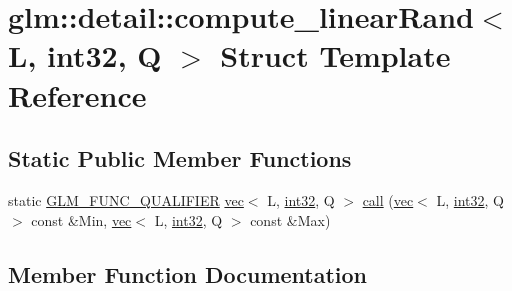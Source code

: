 \hypertarget{structglm_1_1detail_1_1compute__linear_rand_3_01_l_00_01int32_00_01_q_01_4}{}\section{glm\+:\+:detail\+:\+:compute\+\_\+linear\+Rand$<$ L, int32, Q $>$ Struct Template Reference}
\label{structglm_1_1detail_1_1compute__linear_rand_3_01_l_00_01int32_00_01_q_01_4}
\subsection*{Static Public Member Functions}
\begin{DoxyCompactItemize}
\item 
static \mbox{\hyperlink{setup_8hpp_a33fdea6f91c5f834105f7415e2a64407}{G\+L\+M\+\_\+\+F\+U\+N\+C\+\_\+\+Q\+U\+A\+L\+I\+F\+I\+ER}} \mbox{\hyperlink{structglm_1_1vec}{vec}}$<$ L, \mbox{\hyperlink{namespaceglm_1_1detail_a9f85b4efeca416cdcec2fd08939a2e17}{int32}}, Q $>$ \mbox{\hyperlink{structglm_1_1detail_1_1compute__linear_rand_3_01_l_00_01int32_00_01_q_01_4_a6189fc7b1f62fe6c2c046bb5374ffa2a}{call}} (\mbox{\hyperlink{structglm_1_1vec}{vec}}$<$ L, \mbox{\hyperlink{namespaceglm_1_1detail_a9f85b4efeca416cdcec2fd08939a2e17}{int32}}, Q $>$ const \&Min, \mbox{\hyperlink{structglm_1_1vec}{vec}}$<$ L, \mbox{\hyperlink{namespaceglm_1_1detail_a9f85b4efeca416cdcec2fd08939a2e17}{int32}}, Q $>$ const \&Max)
\end{DoxyCompactItemize}


\subsection{Member Function Documentation}
\mbox{\label{structglm_1_1detail_1_1compute__linear_rand_3_01_l_00_01int32_00_01_q_01_4_a6189fc7b1f62fe6c2c046bb5374ffa2a}} 
